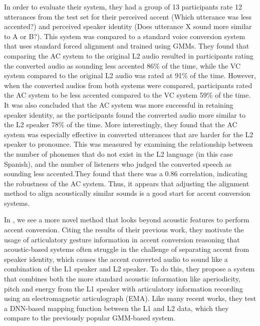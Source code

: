 \documentclass
[
    a4paper,
    twoside,
    12pt,
]
{report}
\begin{document}
In order to evaluate their system, they had a group of 13 participants
rate 12 utterances from the test set for their perceived accent (Which
utterance was less accented?) and perceived speaker identity (Does
utterance X sound more similar to A or B?). This system was compared to
a standard voice conversion system that uses standard forced alignment
and trained using GMMs. They found that comparing the AC system to the
original L2 audio resulted in participants rating the converted audio as
sounding less accented 86\% of the time, while the VC system compared to
the original L2 audio was rated at 91\% of the time. However, when the
converted audios from both systems were compared, participants rated the
AC system to be less accented compared to the VC system 59\% of the
time. It was also concluded that the AC system was more successful in
retaining speaker identity, as the participants found the converted
audio more similar to the L2 speaker 78\% of the time. More
interestingly, they found that the AC system was especially effective in
converted utterances that are harder for the L2 speaker to pronounce.
This was measured by examining the relationship between the number of
phonemes that do not exist in the L2 language (in this case Spanish),
and the number of listeners who judged the converted speech as sounding
less accented.They found that there was a 0.86 correlation, indicating
the robustness of the AC system. Thus, it appears that adjusting the
alignment method to align acoustically similar sounds is a good start
for accent conversion systems.

\colorbox{magenta}{\textcite{aryal2014a}}

In \textcite{aryal2015}, we see a more novel method that looks beyond
acoustic features to perform accent conversion. Citing the results of
their previous work, they motivate the usage of articulatory gesture
information in accent conversion reasoning that acoustic-based systems
often struggle in the challenge of separating accent from speaker
identity, which causes the accent converted audio to sound like a
combination of the L1 speaker and L2 speaker. To do this, they propose a
system that combines both the more standard acoustic information like
aperiodicity, pitch and energy from the L1 speaker with articulatory
information recording using an electromagnetic articulograph (EMA). Like
many recent works, they test a DNN-based mapping function between the L1
and L2 data, which they compare to the previously popular GMM-based
system.
\end{document}
